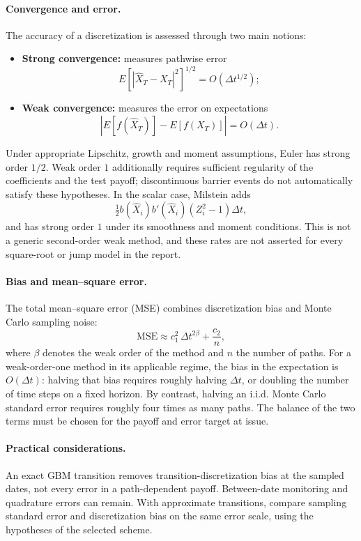\paragraph{Convergence and error.}
The accuracy of a discretization is assessed through two main notions:
\begin{itemize}[leftmargin=10mm]
  \item \textbf{Strong convergence:} measures pathwise error  
  \[
  E[|\widehat{X}_T - X_T|^2]^{1/2} = O(\Delta t^{1/2});
  \]
  \item \textbf{Weak convergence:} measures the error on expectations  
  \[
  |E[f(\widehat{X}_T)] - E[f(X_T)]| = O(\Delta t).
  \]
\end{itemize}
Under appropriate Lipschitz, growth and moment assumptions, Euler
has strong order $1/2$. Weak order $1$ additionally requires sufficient
regularity of the coefficients and the test payoff; discontinuous
barrier events do not automatically satisfy these hypotheses.
In the scalar case, Milstein adds
\[
\tfrac12 b(\widehat X_i)b'(\widehat X_i)(Z_i^2-1)\Delta t,
\]
and has strong order $1$ under its smoothness and moment conditions.
This is not a generic second-order weak method, and these rates are
not asserted for every square-root or jump model in the report.

\paragraph{Bias and mean--square error.}
The total mean--square error (MSE) combines discretization bias and Monte Carlo sampling noise:
\[
\mathrm{MSE} \approx c_1^2\,\Delta t^{2\beta} + \frac{c_2}{n},
\]
where \(\beta\) denotes the weak order of the method and \(n\) the number of paths.  
For a weak-order-one method in its applicable regime, the bias in
the expectation is $O(\Delta t)$: halving that bias requires roughly
halving $\Delta t$, or doubling the number of time steps on a fixed
horizon. By contrast, halving an i.i.d. Monte Carlo standard error
requires roughly four times as many paths. The balance of the two
terms must be chosen for the payoff and error target at issue.

\paragraph{Practical considerations.}
An exact GBM transition removes transition-discretization bias at the
sampled dates, not every error in a path-dependent payoff. Between-date
monitoring and quadrature errors can remain. With approximate
transitions, compare sampling standard error and discretization bias
on the same error scale, using the hypotheses of the selected scheme.

